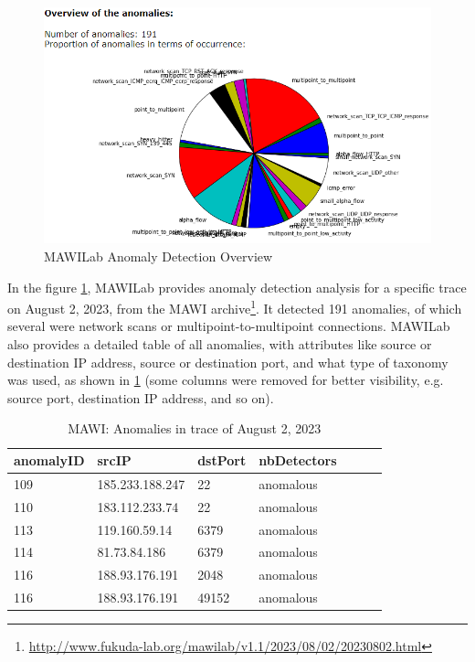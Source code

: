 \documentclass[sigconf,authorversion,nonacm]{acmart}
\begin{document}
\begin{figure}
        \includegraphics[width=\linewidth]{MAWI/MAWILab.PNG}
        \caption{MAWILab Anomaly Detection Overview}
        \label{MAWI: MAWILab Anomaly Detection Overview}
\end{figure}

In the figure \ref{MAWI: MAWILab Anomaly Detection Overview}, MAWILab provides anomaly detection analysis for a specific trace on August 2, 2023, from the MAWI archive\footnote{\url{http://www.fukuda-lab.org/mawilab/v1.1/2023/08/02/20230802.html}}. It detected 191 anomalies, of which several were network scans or multipoint-to-multipoint connections. MAWILab also provides a detailed table of all anomalies, with attributes like source or destination IP address, source or destination port, and what type of taxonomy was used, as shown in \ref{anomaly} (some columns were removed for better visibility, e.g. source port, destination IP address, and so on).

\begin{table}[!ht]
    \centering
    \caption{MAWI: Anomalies in trace of August 2, 2023}
    \label{anomaly}
    \begin{tabular}{|l|l|l|l|l|l|l|}
    \hline
        anomalyID &  srcIP & dstPort & nbDetectors \\ \hline
        109 & 185.233.188.247 & 22 & anomalous \\ \hline
        110 & 183.112.233.74 & 22 & anomalous \\ \hline
        113 & 119.160.59.14 & 6379 & anomalous \\ \hline
        114 & 81.73.84.186 & 6379 & anomalous \\ \hline
        116 & 188.93.176.191 & 2048 & anomalous \\ \hline
        116 & 188.93.176.191 & 49152 & anomalous \\ \hline
    \end{tabular}
\end{table}
\end{document}
